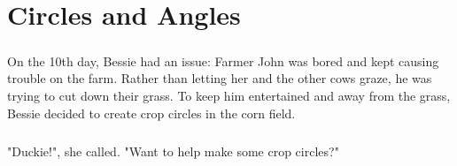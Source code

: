 \chapter{Circles and Angles}
\paragraph{} On the 10th day, Bessie had an issue: Farmer John was bored and kept causing trouble on the farm. Rather than letting her and the other cows graze, he was trying to cut down their grass. To keep him entertained and away from the grass, Bessie decided to create crop circles in the corn field.
\paragraph{} "Duckie!", she called. "Want to help make some crop circles?"
